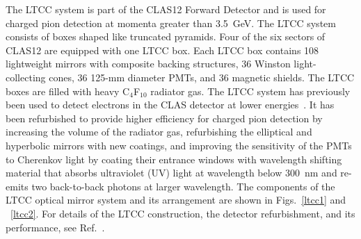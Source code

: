 \documentclass[final,3p]{elsarticle}
\begin{document}
\begin{twocolumn}
The LTCC system is part of the CLAS12  Forward Detector and is used for charged pion detection at momenta
greater than 3.5~GeV. The LTCC system consists of boxes shaped like truncated pyramids. Four of the six sectors
of CLAS12 are equipped with one LTCC box. Each LTCC box contains 108 lightweight mirrors with composite
backing structures, 36 Winston light-collecting cones, 36 125-mm diameter PMTs, and 36 magnetic shields. The
LTCC boxes are filled with heavy C$_4$F$_{10}$ radiator gas. The LTCC system has previously been used to
detect electrons in the CLAS detector at lower energies~\cite{Adams:2001kk}. It has been refurbished to provide
higher efficiency for charged pion detection by increasing the volume of the radiator gas, refurbishing the elliptical
and hyperbolic mirrors with new coatings, and improving the sensitivity of the PMTs to Cherenkov light by coating
their entrance windows with wavelength shifting material that absorbs ultraviolet (UV) light at wavelength below
300~nm and re-emits two back-to-back photons at larger wavelength. The components of the LTCC optical mirror
system and its arrangement are shown in Figs.~\ref{ltcc1} and ~\ref{ltcc2}. For details of the LTCC construction,
the detector refurbishment, and its performance, see Ref.~\cite{LTCC}.   


\end{twocolumn}
\end{document}

